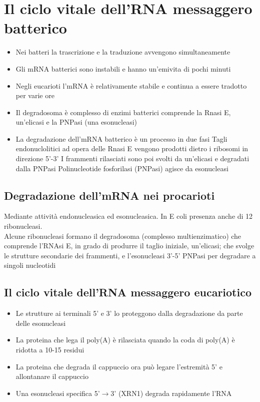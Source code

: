 \documentclass{article}
\begin{document}
\section{Il ciclo vitale dell'RNA messaggero batterico}
\begin{itemize}
    \item Nei batteri la trascrizione e la traduzione avvengono simultaneamente
    \item Gli mRNA batterici sono instabili e hanno un'emivita di pochi minuti
    \item Negli eucarioti l'mRNA è relativamente stabile e continua a essere tradotto per varie ore
    \item Il degradosoma è complesso di enzimi batterici comprende la Rnasi E, un'elicasi e la PNPasi (una esonucleasi)
    \item La degradazione dell'mRNA batterico è un processo in due fasi
     Tagli endonuclolitici ad opera delle Rnasi E vengono prodotti dietro i ribosomi in direzione 5'-3'
     I frammenti rilasciati sono poi svolti da un'elicasi e degradati dalla PNPasi
    \subsubitem Polinucleotide fosforilasi (PNPasi) agisce da esonucleasi
\end{itemize}
\subsection{Degradazione dell'mRNA nei procarioti}
Mediante attività endonucleasica ed esonucleasica. In E coli presenza anche di 12 ribonucleasi.\\
Alcune ribonucleasi formano il degradosoma (complesso multienzimatico) che comprende l'RNAsi E, in grado di
produrre il taglio iniziale, un'elicasi; che svolge le strutture secondarie dei frammenti, e l'esonucleasi 3'-5' PNPasi per degradare a singoli nucleotidi
\subsection{Il ciclo vitale dell'RNA messaggero eucariotico}
\begin{itemize}
    \item Le strutture ai terminali 5' e 3' lo proteggono dalla degradazione da parte delle esonucleasi
    \item La proteina che lega il poly(A) è rilasciata quando la coda di poly(A) è ridotta a 10-15 residui
    \item La proteina che degrada il cappuccio ora può legare l'estremità 5' e allontanare il cappuccio
    \item Una esonucleasi specifica 5'$\rightarrow$3' (XRN1) degrada rapidamente l'RNA
\end{itemize}
\end{document}
